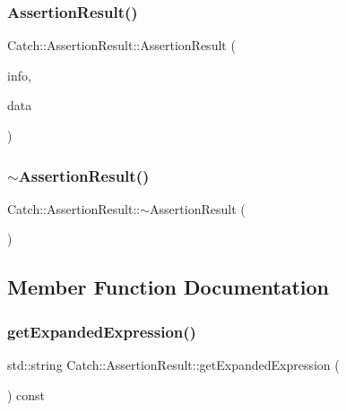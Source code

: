 \subsubsection{\texorpdfstring{Assertion\+Result()}{AssertionResult()}\hspace{0.1cm}{\footnotesize\ttfamily [2/2]}}
{\footnotesize\ttfamily Catch\+::\+Assertion\+Result\+::\+Assertion\+Result (\begin{DoxyParamCaption}\item[{\hyperlink{struct_catch_1_1_assertion_info}{Assertion\+Info} const \&}]{info,  }\item[{\hyperlink{struct_catch_1_1_assertion_result_data}{Assertion\+Result\+Data} const \&}]{data }\end{DoxyParamCaption})}

\hypertarget{class_catch_1_1_assertion_result_abf90f5abd04d38b2fb4f5d575bdc4f1e}{}\label{class_catch_1_1_assertion_result_abf90f5abd04d38b2fb4f5d575bdc4f1e} 
\subsubsection{\texorpdfstring{$\sim$\+Assertion\+Result()}{~AssertionResult()}}
{\footnotesize\ttfamily Catch\+::\+Assertion\+Result\+::$\sim$\+Assertion\+Result (\begin{DoxyParamCaption}{ }\end{DoxyParamCaption})}



\subsection{Member Function Documentation}
\hypertarget{class_catch_1_1_assertion_result_aaa46070791a6c07caaed86229b8d9d75}{}\label{class_catch_1_1_assertion_result_aaa46070791a6c07caaed86229b8d9d75} 
\subsubsection{\texorpdfstring{get\+Expanded\+Expression()}{getExpandedExpression()}}
{\footnotesize\ttfamily std\+::string Catch\+::\+Assertion\+Result\+::get\+Expanded\+Expression (\begin{DoxyParamCaption}{ }\end{DoxyParamCaption}) const}


